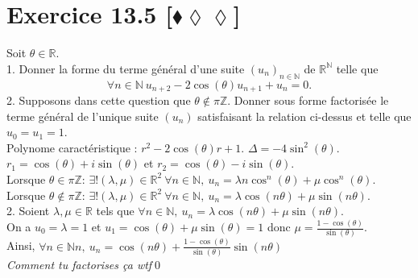 \documentclass[10pt]{article}
\begin{document}
\section*{Exercice 13.5 [$\blacklozenge\lozenge\lozenge$]}
\begin{tcolorbox}[enhanced, width=7.6in, center, size=fbox, fontupper=\large, drop shadow southwest]
    Soit $\theta\in\mathbb{R}$.\\
    1. Donner la forme du terme général d'une suite $(u_n)_{n\in\mathbb{N}}$ de $\mathbb{R}^\mathbb{N}$ telle que
    \begin{equation*}
        \forall n \in \mathbb{N} ~ u_{n+2} - 2\cos(\theta)u_{n+1} + u_n = 0.
    \end{equation*}
    2. Supposons dans cette question que $\theta \notin \pi\mathbb{Z}$. Donner sous forme factorisée le terme général de l'unique suite $(u_n)$ satisfaisant la relation ci-dessus et telle que $u_0=u_1=1$.\\[0.1cm]
    Polynome caractéristique : $r^2 - 2\cos(\theta)r + 1$. $\Delta = -4\sin^2(\theta)$. $r_1 = \cos(\theta) + i\sin(\theta)$ et $r_2 = \cos(\theta) - i\sin(\theta)$.\\
    Lorsque $\theta\in\pi\mathbb{Z}$: $\exists!(\lambda,\mu)\in\mathbb{R}^2 ~ \forall n\in\mathbb{N}, ~ u_n = \lambda n \cos^n(\theta) + \mu \cos^n(\theta)$.\\
    Lorsque $\theta\notin\pi\mathbb{Z}$: $\exists!(\lambda,\mu)\in\mathbb{R}^2 ~ \forall n\in\mathbb{N}, ~ u_n = \lambda \cos(n\theta) + \mu\sin(n\theta)$.\\
    2. Soient $\lambda,\mu\in\mathbb{R}$ tels que $\forall n\in\mathbb{N}, ~ u_n = \lambda\cos(n\theta)+\mu\sin(n\theta)$.\\
    On a $u_0 = \lambda = 1$ et $u_1 = \cos(\theta) + \mu\sin(\theta) = 1$ donc $\mu = \frac{1-\cos(\theta)}{\sin(\theta)}$.\\
    Ainsi, $\forall n\in\mathbb{N}n, ~ u_n = \cos(n\theta) + \frac{1-\cos(\theta)}{\sin(\theta)}\sin(n\theta)$\\
    \emph{Comment tu factorises ça wtf}\qed
\end{tcolorbox}

\end{document}

